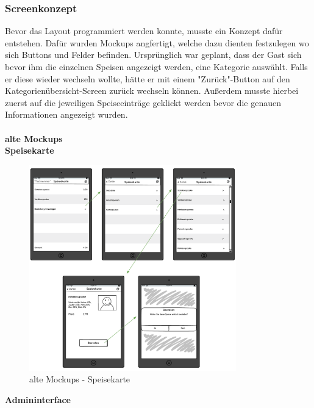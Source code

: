     \subsubsection{Screenkonzept}
Bevor das Layout programmiert werden konnte, musste ein Konzept dafür entstehen. Dafür wurden Mockups angfertigt, welche dazu dienten festzulegen wo sich Buttons und Felder befinden.
Ursprünglich war geplant, dass der Gast sich bevor ihm die einzelnen Speisen angezeigt werden, eine Kategorie auswählt. Falls er diese wieder wechseln wollte, hätte er mit einem "Zurück"-Button auf den Kategorienübersicht-Screen zurück wechseln können. Außerdem musste hierbei zuerst auf die jeweiligen Speiseeinträge geklickt werden bevor die genauen Informationen angezeigt wurden.
\\ \\
\textbf{alte Mockups}\\
\textbf{Speisekarte}\\
			\begin{figure}[H]
			\begin{centering}
			\includegraphics[width = 0.8\textwidth]{Bilder/Jok_alte_mockups}
			\par\end{centering}
			\caption{alte Mockups - Speisekarte}
			\label{alte Mockups - Speisekarte}
			\end{figure}\textbf{Admininterface}\\
